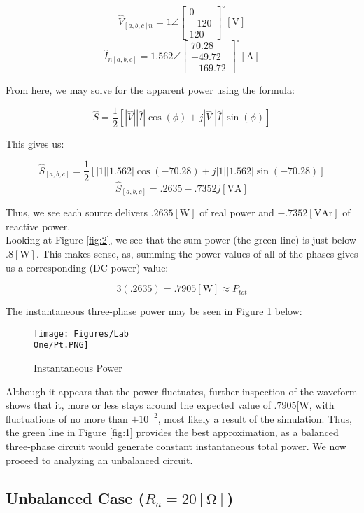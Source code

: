 \documentclass[
	letterpaper, %
	10pt, %
]{CSUniSchoolLabReport}
\begin{document}
  $$\hat{V}_{[a,b,c]n}=1\angle\left[ \begin{matrix} 0\\-120\\120 \end{matrix}\right]^{\circ}[\si{\volt}]$$
  $$\hat{I}_{n[a,b,c]}=1.562\angle\left[ \begin{matrix} 70.28\\-49.72\\-169.72 \end{matrix}\right]^{\circ}[\si{\ampere}]$$

  From here, we may solve for the apparent power using the formula:

  $$\hat{S}=\frac{1}{2}\left[|\hat{V}||\hat{I}|\cos(\phi)+j|\hat{V}||\hat{I}|\sin(\phi)\right]$$

  This gives us:

  $$\hat{S}_{[a,b,c]}=\frac{1}{2}\left[|1||1.562|\cos(-70.28)+j|1||1.562|\sin(-70.28)\right]$$
  $$\hat{S}_{[a,b,c]}=.2635-.7352j[\si{\volt\ampere}]$$

  Thus, we see each source delivers $.2635[\si{\watt}]$ of real power and $-.7352[\text{VAr}]$ of reactive power.\\

  Looking at Figure \ref{fig:2}, we see that the sum power (the green line) is just below $.8[\si{\watt}]$. This makes sense, as, summing the power values of all of the phases gives us a corresponding (DC power) value:

  $$3(.2635)=.7905[\si{\watt}]\approx P_{tot}$$

  The instantaneous three-phase power may be seen in Figure \ref{fig:6} below:

  \begin{figure}[H]
    \centering
    \texttt{[image: Figures/Lab\\ One/Pt.PNG]}
    \caption{Instantaneous Power}
    \label{fig:6}
  \end{figure}

  Although it appears that the power fluctuates, further inspection of the waveform shows that it, more or less stays around the expected value of $.7905[\si{\watt}$, with fluctuations of no more than $\pm10^{-2}$, most likely a result of the simulation. Thus, the green line in Figure \ref{fig:1} provides the best approximation, as a balanced three-phase circuit would generate constant instantaneous total power. We now proceed to analyzing an unbalanced circuit.

\subsection{Unbalanced Case ($R_a=20[\si{\ohm}]$)}
\end{document}
